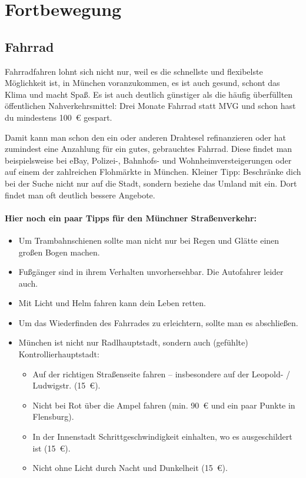 ﻿
\section{Fortbewegung}

\subsection{Fahrrad}

Fahrradfahren lohnt sich nicht nur, weil es die schnellste und
flexibelste Möglichkeit ist, in München voranzukommen, es ist auch
gesund, schont das Klima und macht Spaß.  Es ist auch deutlich
günstiger als die häufig überfüllten öffentlichen Nahverkehrsmittel:
Drei Monate Fahrrad statt MVG und schon hast du mindestens 100~€
gespart.

Damit kann man schon den ein oder anderen Drahtesel refinanzieren oder
hat zumindest eine Anzahlung für ein gutes, gebrauchtes Fahrrad. Diese
findet man beispielsweise bei eBay, Polizei-, Bahnhofs- und
Wohnheimversteigerungen oder auf einem der zahlreichen Flohmärkte in
München. Kleiner Tipp: Beschränke dich bei der Suche nicht nur auf die
Stadt, sondern beziehe das Umland mit ein. Dort findet man oft
deutlich bessere Angebote.

\paragraph{Hier noch ein paar Tipps für den Münchner Straßenverkehr:}
\begin{itemize}
	\item Um Trambahnschienen sollte man nicht nur bei Regen und Glätte einen großen Bogen machen.
	\item Fußgänger sind in ihrem Verhalten unvorhersehbar. Die Autofahrer leider auch.
	\item Mit Licht und Helm fahren kann dein Leben retten.
	\item Um das Wiederfinden des Fahrrades zu erleichtern, sollte man es abschließen.
	\item München ist nicht nur Radlhauptstadt, sondern auch (gefühlte) Kontrollierhauptstadt:

	\begin{itemize}
        	\item Auf der richtigen Straßenseite fahren -- insbesondere auf der Leopold- / Ludwigstr. (15~€).
	        \item Nicht bei Rot über die Ampel fahren (min. 90~€ und ein paar Punkte in Flensburg).
	        \item In der Innenstadt Schrittgeschwindigkeit einhalten, wo es ausgeschildert ist (15~€).
	        \item Nicht ohne Licht durch Nacht und Dunkelheit (15~€).
	\end{itemize}
\end{itemize}

